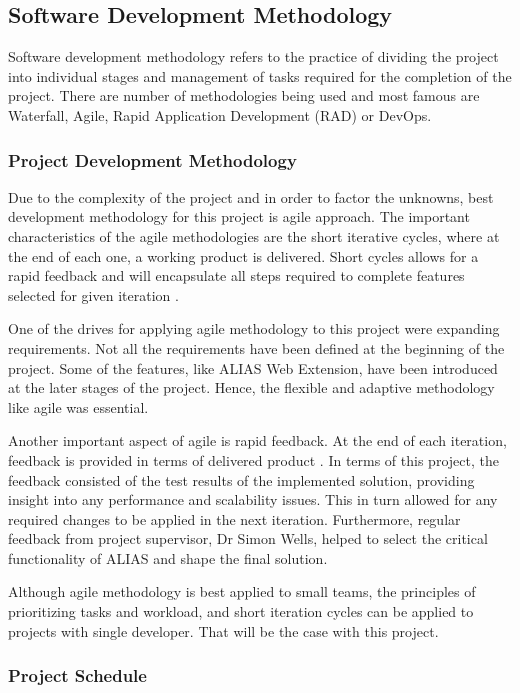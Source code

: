 \subsection{Software Development Methodology}
Software development methodology refers to the practice of dividing the project into individual stages and management of tasks required for the completion of the project. There are number of methodologies being used and most famous are Waterfall, Agile, Rapid Application Development (RAD) or DevOps. 

\subsubsection{Project Development Methodology}
Due to the complexity of the project and in order to factor the unknowns, best development methodology for this project is agile approach. The important characteristics of the agile methodologies are the short iterative cycles, where at the end of each one, a working product is delivered. Short cycles allows for a rapid feedback and will encapsulate all steps required to complete features selected for given iteration \citep{agile1}.

One of the drives for applying agile methodology to this project were expanding requirements. Not all the requirements have been defined at the beginning of the project. Some of the features, like ALIAS Web Extension, have been introduced at the later stages of the project. Hence, the flexible and adaptive methodology like agile was essential. 

Another important aspect of agile is rapid feedback. At the end of each iteration, feedback is provided in terms of delivered product \citep{agilebook}. In terms of this project, the feedback consisted of the test results of the implemented solution, providing insight into any performance and scalability issues. This in turn allowed for any required changes to be applied in the next iteration. Furthermore, regular feedback from project supervisor, Dr Simon Wells, helped to select the critical functionality of ALIAS and shape the final solution.

Although agile methodology is best applied to small teams, the principles of prioritizing tasks and workload, and short iteration cycles can be applied to projects with single developer. That will be the case with this project. 

\subsubsection{Project Schedule}

